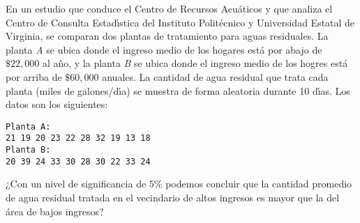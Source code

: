 \begin{enunciado}
 En un estudio que conduce el Centro de Recursos Acu\'aticos
 y que analiza el Centro de Consulta Estad\'{\i}stica
 del Instituto Polit\'ecnico y Universidad Estatal de Virginia,
 se comparan dos plantas de tratamiento para aguas residuales.
 La planta \textit{A} se ubica donde el ingreso medio de los hogares
 est\'a por abajo de $\$22,000$ al a\~no,
 y la planta \textit{B} se ubica donde el ingreso medio de los hogres
 est\'a por arriba de $\$60,000$ anuales.
 La cantidad de agua residual que trata cada planta
 (miles de galones/d\'{\i}a) se muestra de forma aleatoria
 durante 10 d\'{\i}as.
 Los datos son los siguientes:
 \begin{verbatim}
Planta A:
21 19 20 23 22 28 32 19 13 18
Planta B:
20 39 24 33 30 28 30 22 33 24
 \end{verbatim}
 \vspace{-0.5cm}
 ¿Con un nivel de significancia de $5\%$ podemos concluir que la cantidad promedio de agua residual tratada en el vecindario de altos ingresos es mayor que la del \'area de bajos ingresos?
\end{enunciado}

